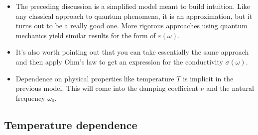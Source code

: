 \documentclass[11pt, oneside]{article}
\begin{document}
\begin{itemize}
	\item The preceding discussion is a simplified model meant to build intuition. Like any classical approach to quantum phenomena, it is an approximation, but it turns out to be a really good one. More rigorous approaches using quantum mechanics yield similar results for the form of $\varepsilon(\omega)$.
	\item It's also worth pointing out that you can take essentially the same approach and then apply Ohm's law to get an expression for the conductivity $\sigma(\omega)$.
	\item Dependence on physical properties like temperature $T$ is implicit in the previous model. This will come into the damping coefficient $\nu$ and the natural frequency $\omega_0$.
\end{itemize}

\subsection{Temperature dependence}
\end{document}
